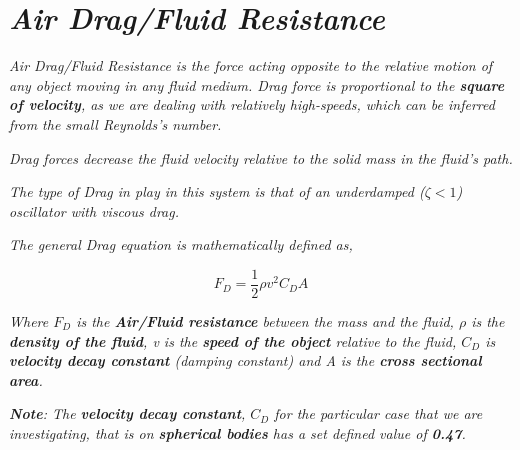         
        
        
\section{\textit{Air Drag/Fluid Resistance}}
        
    \textit{Air Drag/Fluid Resistance is the force acting opposite to the relative motion of any object moving in any fluid medium. Drag force is proportional to the \textbf{square of velocity}, as we are dealing with relatively high-speeds, which can be inferred from the small Reynolds's number.}
            
    \textit{Drag forces decrease the fluid velocity relative to the solid mass in the fluid's path.}
            
    \textit{The type of Drag in play in this system is that of an underdamped ($\zeta < 1$) oscillator with viscous drag.}
            
    \textit{The general Drag equation is mathematically defined as,}
            
        $$F_D = \frac{1}{2}\rho v^2C_DA$$
           
    \textit{Where $F_D$ is the \textbf{Air/Fluid resistance} between the mass and the fluid, $\rho$ is the \textbf{density of the fluid}, v is the \textbf{speed of the object} relative to the fluid, $C_D$ is \textbf{velocity decay constant} (damping constant) and A is the \textbf{cross sectional area}.}
            
    \textit{\textbf{Note}: The\textbf{ velocity decay constant}, $C_D$ for the particular case that we are investigating, that is on \textbf{spherical bodies} has a set defined value of \textbf{0.47}.}
            
            
